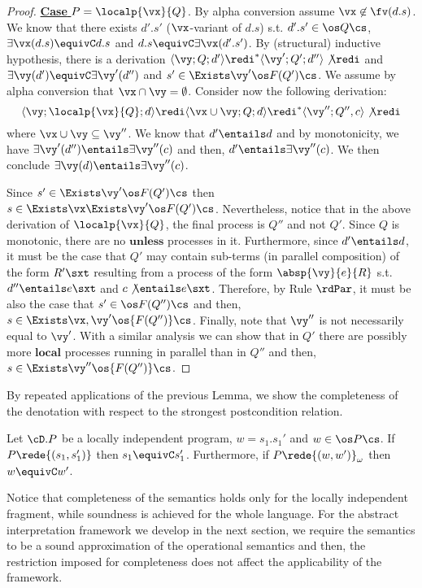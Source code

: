\documentclass{tlp}
\begin{document}
\begin{proof}
\noindent \underline{{\bf Case}  $P = \localp{\vx}{Q}$}. By alpha conversion assume $\vx \not\in \fv(d.s)$. We know that there exists $d'.s'$ ($\vx$-variant of $d.s$) s.t. $d'.s' \in \os Q \cs$, $\exists \vx (d.s) \equivC d.s$ and  $ d.s \equivC \exists \vx(d'.s')$. By (structural) inductive hypothesis, there is a derivation 
$\langle \vy; Q;d'\rangle \redi^* \langle \vy';Q'; d''\rangle\not\redi$ and 
$\exists \vy(d') \equivC \exists \vy' ( d'')$ and 
$s' \in \Exists \vy' \os F(Q')\cs$. We assume by alpha conversion that $\vx \cap \vy = \emptyset$. Consider now the following  derivation:
\[
\langle \vy;\localp{\vx}{Q}; d \rangle
\redi
\langle  \vx\cup \vy;Q ; d \rangle
 \redi^* \langle \vy''; Q'', c\rangle\not\redi
\]
where $\vx\cup \vy \subseteq \vy''$.  We know that $d' \entails d$ and by monotonicity, we have $\exists \vy' ( d'') \entails \exists \vy''(c)$ and then,  $d' \entails  \exists \vy''(c)$. We then conclude  $\exists \vy(d) \entails  \exists \vy''(c)$.

Since  $s' \in \Exists \vy' \os F(Q')\cs$ then $s \in \Exists \vx \Exists \vy' \os F(Q') \cs$. Nevertheless, notice that in the above derivation of $\localp{\vx}{Q}$, the final process is $Q''$ and not $Q'$. Since $Q$ is monotonic, there are no $\mathbf{unless}$ processes in it. Furthermore, since $d' \entails d$, it must be the case that $Q'$ may contain sub-terms (in parallel composition) of the form  $R'\sxt $ resulting from  a process of the form $\absp{\vy}{e}{R}$ s.t. $d''\entails e\sxt $ and $c\not\entails e\sxt $. 
 Therefore, 
by Rule $\rdPar$, it must be also the case that $s' \in \os F(Q'')\cs$ and then,  $s \in \Exists \vx,\vy' \os {F(Q'')}\cs$. Finally, note that $\vy''$ is not necessarily equal to $\vy'$. With a  similar analysis
 we can show that in $Q'$ there are possibly more $\mathbf{local}$ processes running in parallel than in $Q''$ and then,  $s \in \Exists \vy'' \os {F(Q'')}\cs$.
\end{proof}

By repeated applications of the previous Lemma, we show the completeness of the denotation with respect to the strongest postcondition relation. 
\begin{theorem}[Completeness]\label{theo:completeness}
Let  $\cD.P$ be a locally independent program,  $w=s_1.s_1'$ and $w \in \os P\cs$. If $P\rede{(s_1,s_1')}$ then $s_1 \equivC s_1'$. 
Furthermore, if  $P\rede{(w,w')}_\omega$ then 
$w \equivC w'$. 
\end{theorem}
Notice that completeness of the semantics holds only for the locally independent fragment, while soundness is achieved for the whole language. For the abstract interpretation framework we 
develop in the next section, we require the semantics to be a sound approximation of the operational semantics and then, the restriction imposed for completeness does not affect the applicability of the framework. 
\end{document}
